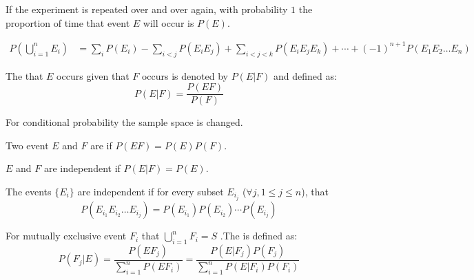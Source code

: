 If the experiment is repeated over and over again, with probability $1$ the proportion of time that event $E$ will occur is $P(E)$.

\begin{theorem}
    \begin{equation}
        \begin{aligned}
            P\left(\bigcup_{i=1}^n E_i \right) &= \sum_i P(E_i) - \sum_{i < j}P(E_i E_j) + \sum_{i < j < k} P(E_i E_j E_k) + \cdots + (-1)^{n+1} P(E_1 E_2 \dots E_n)
        \end{aligned}
    \end{equation}
\end{theorem}

\begin{definition}
    The  that $E$ occurs given that $F$ occurs is denoted by $P(E|F)$ and defined as:
    \begin{equation}
        P(E|F) = \frac{P(EF)}{P(F)}
    \end{equation}
    
    For conditional probability the sample space is changed.
\end{definition}

\begin{definition}[independent]
    Two event $E$ and $F$ are  if $P(EF) = P(E) P(F)$.
\end{definition}

\begin{theorem}
    $E$ and $F$ are independent if $P(E|F) = P(E)$.    
\end{theorem}

\begin{definition}
    The events $\{ E_i \}$ are independent if for every subset $E_{i_j}$ ($ \forall j, 1 \leq j \leq n$), that
    \begin{equation}
        P(E_{i_1} E_{i_2} \dots E_{i_j}) = P(E_{i_1}) P(E_{i_2}) \cdots P(E_{i_j})
    \end{equation}
\end{definition}

\begin{definition}
    For mutually exclusive event $F_i$ that $\displaystyle \bigcup_{i=1}^n F_i = S$ .The  is defined as:
    \begin{equation}
    \displaystyle P(F_j | E) = \frac{P(EF_j)}{\sum\limits_{i=1}^n P(EF_i)} = \frac{P(E|F_j) P(F_j)}{\sum\limits_{i=1}^n P(E|F_i) P(F_i)}
    \end{equation}
\end{definition}

